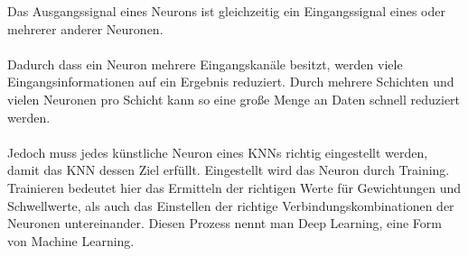 \documentclass[12pt,oneside,a4paper,parskip]{scrbook}
\begin{document}
Das Ausgangssignal eines Neurons ist gleichzeitig ein Eingangssignal eines oder mehrerer anderer Neuronen. %
\\\\
Dadurch dass ein Neuron mehrere Eingangskanäle besitzt, werden viele Eingangsinformationen auf ein Ergebnis reduziert. Durch mehrere Schichten und vielen Neuronen pro Schicht kann so eine große Menge an Daten schnell reduziert werden.
\\\\
Jedoch muss jedes künstliche Neuron eines KNNs richtig eingestellt werden, damit das KNN dessen Ziel erfüllt. Eingestellt wird das Neuron durch Training. Trainieren bedeutet hier das Ermitteln der richtigen Werte für Gewichtungen und Schwellwerte, als auch das Einstellen der richtige Verbindungskombinationen der Neuronen untereinander. Diesen Prozess nennt man Deep Learning, eine Form von Machine Learning.
\end{document}
